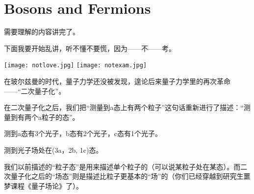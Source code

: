 \documentclass[CJK]{beamer}
\begin{document}
\section{Bosons and Fermions}

\begin{frame}
\bch
需要理解的内容讲完了。

\skipline

下面我要开始乱讲，听不懂不要慌，因为——不——考。

\skiplines

\texttt{[image: notlove.jpg]} \hspace{0.1in} \texttt{[image: notexam.jpg]}

\ech
\end{frame}

\begin{frame}
\bch
在玻尔兹曼的时代，量子力学还没被发现，遑论后来量子力学里的再次革命——“二次量子化”。

\skiplines

在二次量子化之后，我们把“测量到a态上有两个粒子”这句话重新进行了描述：“测量到有两个a粒子的态”。

\skipline

\ech
\end{frame}


\begin{frame}
\bch
{}

测到a态有3个光子，b态有2个光子，c态有1个光子。
\ech
\end{frame}


\begin{frame}
\bch
{}
\emini
{}
测到光子场处在(3a，2b, 1c)态。

\skiplines

我们以前描述的“粒子态”是用来描述单个粒子的（可以说某粒子处在某态）。而二次量子化之后的“场态”则是描述比粒子更基本的“场”的（\bye 你们已经穿越到研究生噩梦课程《量子场论》了）。

\emini

\ech
\end{frame}
\end{document}
